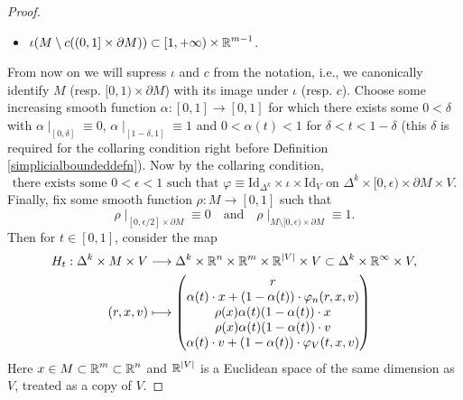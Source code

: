 \documentclass[a4paper, oneside]{amsart}
\newcommand{\Id}{\mathrm{Id}}
\newcommand{\1}{\mathds{1}}
\theoremstyle{remark}
\theoremstyle{definition}
\newcommand{\R}{{\scaleobj{0.97}{\mathbb{R}}}}
\numberwithin{equation}{section}
\begin{document}
\begin{proof}
\begin{itemize}
        \item[($ii$)] $\iota(M\setminus c((0,1]\times \partial M))\subset [1,+\infty)\times \R^{m-1}$.
    \end{itemize}
    From now on we will supress $\iota$ and $c$ from the notation, i.e., we canonically identify $M$ (resp. $[0,1)\times \partial M$) with its image under $\iota$ (resp. $c$). Choose some increasing smooth function $\alpha: [0,1]\to[0,1]$ for which there exists some $0<\delta$ with $\alpha\mid_{[0,\delta]}\equiv 0$, $\alpha\mid_{[1-\delta,1]}\equiv 1$ and $0<\alpha(t)<1$ for $\delta<t<1-\delta$ (this $\delta$ is required for the collaring condition right before Definition \ref{simplicialboundeddefn}). Now by the collaring condition,
    \begin{equation}\label{sentenceequation}
        \text{there exists some $0<\epsilon<1$ such that $\varphi\equiv \Id_{\Delta^k}\times\iota\times \Id_V$ on $\Delta^k\times[0,\epsilon)\times\partial M\times V$.}
    \end{equation}
Finally, fix some smooth function $\rho: M\to [0,1]$ such that
    $$
\rho\mid_{[0,\epsilon/2]\times \partial M}\equiv 0\quad \text{and}\quad \rho\mid_{M\setminus[0,\epsilon)\times\partial M}\equiv 1.
    $$
Then for $t\in [0,1]$, consider the map 
\begin{align}
H_t: \Delta^k\times M\times V&\longrightarrow \Delta^k\times \R^n\times \R^m\times \R^{|V|}\times V\subset \Delta^k\times \R^\infty\times V,\nonumber\\
\label{Htmapcoordinates}(r,x,v)&\longmapsto \begin{pmatrix}
    r\\
    \alpha(t)\cdot x+(1-\alpha(t))\cdot\varphi_n(r,x,v)\\
    \rho(x)\alpha(t)(1-\alpha(t))\cdot x\\
    \rho(x)\alpha(t)(1-\alpha(t))\cdot v\\
    \alpha(t)\cdot v+(1-\alpha(t))\cdot \varphi_V(t,x,v)
\end{pmatrix}
\end{align}
Here $x\in M\subset \R^m\subset \R^n$ and $\R^{|V|}$ is a Euclidean space of the same dimension as $V$, treated as a copy of $V$.

\end{proof}
\end{document}

